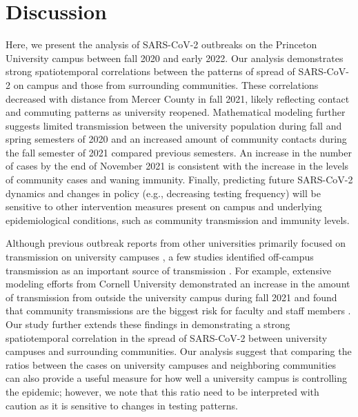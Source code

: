 \documentclass[12pt]{article}
\begin{document}
\section*{Discussion}

Here, we present the analysis of SARS-CoV-2 outbreaks on the Princeton University campus between fall 2020 and early 2022.
Our analysis demonstrates strong spatiotemporal correlations between the patterns of spread of SARS-CoV-2 on campus and those from surrounding communities.
These correlations decreased with distance from Mercer County in fall 2021, likely reflecting contact and commuting patterns as university reopened.
Mathematical modeling further suggests limited transmission between the university population during fall and spring semesters of 2020 and an increased amount of community contacts during the fall semester of 2021 compared previous semesters.
An increase in the number of cases by the end of November 2021 is consistent with the increase in the levels of community cases and waning immunity.
Finally, predicting future SARS-CoV-2 dynamics and changes in policy (e.g., decreasing testing frequency) will be sensitive to other intervention measures present on campus and underlying epidemiological conditions, such as community transmission and immunity levels.

Although previous outbreak reports from other universities primarily focused on transmission on university campuses \citep{wilson2020multiple,currie2021interventions}, a few studies identified off-campus transmission as an important source of transmission \citep{fox2021response,hamer2021assessment}.
For example, extensive modeling efforts from Cornell University demonstrated an increase in the amount of transmission from outside the university campus during fall 2021 and found that community transmissions are the biggest risk for faculty and staff members \citep{frazier2022modeling}.
Our study further extends these findings in demonstrating a strong spatiotemporal correlation in the spread of SARS-CoV-2 between university campuses and surrounding communities.
Our analysis suggest that comparing the ratios between the cases on university campuses and neighboring communities can also provide a useful measure for how well a university campus is controlling the epidemic; however, we note that this ratio need to be interpreted with caution as it is sensitive to changes in testing patterns.
\end{document}
